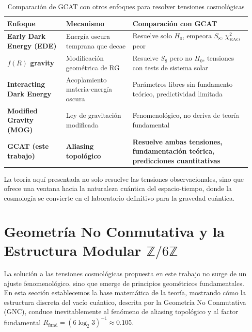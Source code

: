 \documentclass[12pt, a4paper]{article}
\theoremstyle{plain}
\theoremstyle{definition}
\begin{document}
\begin{table}[h]
\centering
\caption{Comparación de GCAT con otros enfoques para resolver tensiones cosmológicas}
\label{tab:comparison_approaches}
\begin{tabular}{p{3cm}p{4cm}p{4cm}}
\toprule
\textbf{Enfoque} & \textbf{Mecanismo} & \textbf{Comparación con GCAT} \\
\midrule
\textbf{Early Dark Energy (EDE)} & Energía oscura temprana que decae & Resuelve solo $H_0$, empeora $S_8$, $\chi^2_{\text{BAO}}$ peor \\
\textbf{$f(R)$ gravity} & Modificación geométrica de RG & Resuelve $S_8$ pero no $H_0$, tensiones con tests de sistema solar \\
\textbf{Interacting Dark Energy} & Acoplamiento materia-energía oscura & Parámetros libres sin fundamento teórico, predictividad limitada \\
\textbf{Modified Gravity (MOG)} & Ley de gravitación modificada & Fenomenológico, no deriva de teoría fundamental \\
\textbf{\textbf{GCAT (este trabajo)}} & \textbf{Aliasing topológico} & \textbf{Resuelve ambas tensiones, fundamentación teórica, predicciones cuantitativas} \\
\bottomrule
\end{tabular}
\end{table}

La teoría aquí presentada no solo resuelve las tensiones observacionales, sino 
que ofrece una ventana hacia la naturaleza cuántica del espacio-tiempo, donde 
la cosmología se convierte en el laboratorio definitivo para la gravedad cuántica.

\section{Geometría No Conmutativa y la Estructura Modular $\mathbb{Z}/6\mathbb{Z}$}
\label{sec:fundamentos}

La solución a las tensiones cosmológicas propuesta en este trabajo no surge de un ajuste fenomenológico, sino que emerge de principios geométricos fundamentales. En esta sección establecemos la base matemática de la teoría, mostrando cómo la estructura discreta del vacío cuántico, descrita por la Geometría No Conmutativa (GNC), conduce inevitablemente al fenómeno de aliasing topológico y al factor fundamental $R_{\text{fund}} = (6\log_2 3)^{-1} \approx 0.105$.
\end{document}
